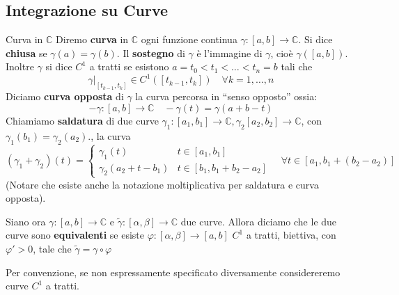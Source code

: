 \subsection{Integrazione su Curve}
\begin{definition}{Curva in \(\mathbb{C}\) }
    Diremo \textbf{curva} in \(\mathbb{C}\) ogni funzione continua \(\gamma : [a,b] \to
    \mathbb{C}\). Si dice \textbf{chiusa} se \(\gamma(a) = \gamma(b)\). Il
    \textbf{sostegno} di \(\gamma\) è l'immagine di \(\gamma\), cioè
    \(\gamma([a,b])\). Inoltre \(\gamma\) si dice \(C^{1}\) a tratti se esistono
    \(a=t_{0}<t_{1}<\dots<t_{n}=b\) tali che 
    \[
        \gamma|_{[t_{k-1} , t_k]} \in C^{1}([t_{k-1}, t_k]) \quad \forall k = 1,
        \dots, n
    \]
    Diciamo \textbf{curva opposta} di \(\gamma\) la curva percorsa in
    ``senso opposto'' ossia:
    \[
        -\gamma : [a,b] \to \mathbb{C} \quad -\gamma(t) = \gamma(a+b-t)
    \]
    Chiamiamo \textbf{saldatura} di due curve \(\gamma_1 : [a_{1}, b_{1}] \to
    \mathbb{C}, \gamma_2 [a_{2}, b_{2}] \to \mathbb{C}\), con
    \(\gamma_{1}(b_{1}) = \gamma_{2}(a_{2}). \), la curva 
    \[
        (\gamma_{1} + \gamma_{2})(t) = \begin{cases}
            \gamma_{1}(t) & t \in [a_{1}, b_{1}] \\
            \gamma_{2}(a_{2} + t - b_{1}) & t \in [b_{1}, b_{1} + b_{2} - a_{2}]
        \end{cases}
        \quad \forall t \in [a_{1}, b_{1} + (b_{2}-a_{2})]
    \]
    (Notare che esiste anche la notazione moltiplicativa per saldatura e curva
    opposta).

Siano ora \(\gamma: [a,b] \to \mathbb{C}\) e \(\tilde{\gamma} : [\alpha, \beta]
\to \mathbb{C}\) due curve. Allora diciamo che le due curve sono
\textbf{equivalenti} se esiste \(\varphi : [\alpha, \beta] \to [a,b]\) \(C^{1}\)
a tratti, biettiva, con \(\varphi'>0\), tale che
\(
    \tilde\gamma = \gamma \circ \varphi 
\)
\end{definition}

Per convenzione, se non espressamente specificato diversamente considereremo
curve \(C^{1}\) a tratti.

